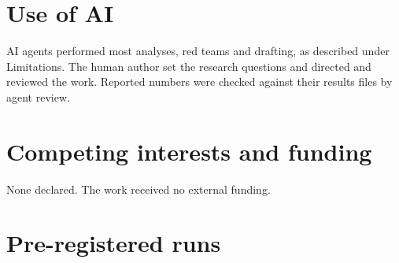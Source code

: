 \documentclass[11pt,a4paper]{article}
\begin{document}
\section*{Use of AI}

AI agents performed most analyses, red teams and drafting, as described under Limitations.
The human author set the research questions and directed and reviewed the work.
Reported numbers were checked against their results files by agent review.

\section*{Competing interests and funding}

None declared. The work received no external funding.




\appendix

\section{Pre-registered runs}
\label{app:prereg}
\end{document}
